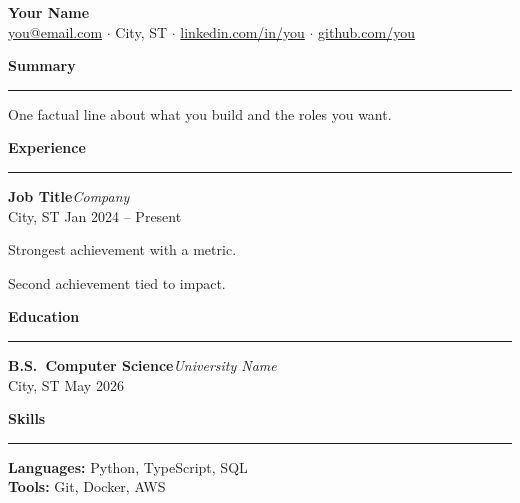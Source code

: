 \documentclass[11pt,letterpaper]{article}
\newcommand{\resumesection}[1]{%
  \par\vspace{0.7em}%
  {\large\bfseries\color{accent}#1}\par
  \vspace{-0.35em}%
  \textcolor{accent}{\rule{\textwidth}{0.6pt}}\par
  \vspace{0.35em}%
}
\newcommand{\role}[3]{%
  \noindent\textbf{#1}\hfill\textit{#2}\\
  \textcolor{muted}{\small #3}\par\vspace{0.15em}
}
\newenvironment{resumeitemize}{%
  \begin{list}{\textbullet}{%
    \setlength{\leftmargin}{1.1em}%
    \setlength{\itemsep}{0.15em}%
    \setlength{\parsep}{0pt}%
    \setlength{\topsep}{0.2em}%
    \setlength{\partopsep}{0pt}%
  }%
}{\end{list}}
\begin{document}
\begin{center}
  {\LARGE\bfseries Your Name}\\[0.35em]
  {\small
    \href{mailto:you@email.com}{you@email.com}
    $\cdot$ City, ST
    $\cdot$ \href{https://linkedin.com/in/you}{linkedin.com/in/you}
    $\cdot$ \href{https://github.com/you}{github.com/you}
  }
\end{center}

\resumesection{Summary}
One factual line about what you build and the roles you want.

\resumesection{Experience}
\role{Job Title}{Company}{City, ST \quad Jan 2024 -- Present}
\begin{resumeitemize}
  \item Strongest achievement with a metric.
  \item Second achievement tied to impact.
\end{resumeitemize}

\resumesection{Education}
\role{B.S.\ Computer Science}{University Name}{City, ST \quad May 2026}

\resumesection{Skills}
\noindent\textbf{Languages:} Python, TypeScript, SQL\\
\textbf{Tools:} Git, Docker, AWS
\end{document}
